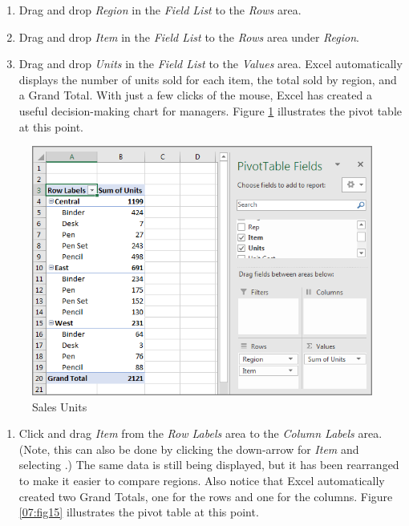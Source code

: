 \begin{enumerate}[resume]
	\item Drag and drop \textit{Region} in the \textit{Field List} to the \textit{Rows} area. 
	\item Drag and drop \textit{Item} in the \textit{Field List} to the \textit{Rows} area under \textit{Region}.
	\item Drag and drop \textit{Units} in the \textit{Field List} to the \textit{Values} area. Excel automatically displays the number of units sold for each item,  the total sold by region, and a Grand Total. With just a few clicks of the mouse, Excel has created a useful decision-making chart for managers. Figure \ref{07:fig14} illustrates the pivot table at this point.
\end{enumerate}

\begin{figure}[H]
	\centering
	\includegraphics[width=\maxwidth{.95\linewidth}]{gfx/ch07_fig14}
	\caption{Sales Units}
	\label{07:fig14}
\end{figure}
	
\begin{enumerate}[resume]
	\item Click and drag \textit{Item} from the \textit{Row Labels} area to the \textit{Column Labels} area. (Note, this can also be done by clicking the down-arrow for \textit{Item} and selecting .) The same data is still being displayed, but it has been rearranged to make it easier to compare regions. Also notice that Excel automatically created two Grand Totals, one for the rows and one for the columns. Figure \ref{07:fig15} illustrates the pivot table at this point.
\end{enumerate}	

